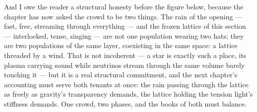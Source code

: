 \documentclass[fontsize=11pt,paper=a4,pagesize=auto,parskip=half-]{scrbook}
\begin{document}
And I owe the reader a structural honesty before the figure below, because the chapter has now asked the crowd to be two things. The rain of the opening --- fast, free, streaming through everything --- and the frozen lattice of this section --- interlocked, tense, singing --- are not one population wearing two hats; they are two populations of the same layer, coexisting in the same space: a lattice threaded by a wind. That is not incoherent --- a star is exactly such a place, its plasma carrying sound while neutrinos stream through the same volume barely touching it --- but it is a real structural commitment, and the next chapter's accounting must serve both tenants at once: the rain passing through the lattice as freely as gravity's transparency demands, the lattice holding the tension light's stiffness demands. One crowd, two phases, and the books of both must balance.
\end{document}
